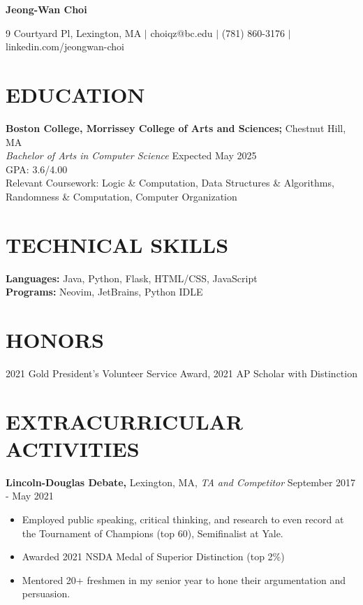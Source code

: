 \documentclass[11pt]{article}
\begin{document}
\begin{center}
\textbf{\LARGE Jeong-Wan Choi}
\end{center}

\begin{center}
9 Courtyard Pl, Lexington, MA $|$ choiqz@bc.edu $|$ (781) 860-3176 $|$ linkedin.com/jeongwan-choi
\end{center}

\section*{EDUCATION}
\textbf{Boston College, Morrissey College of Arts and Sciences;} Chestnut Hill, MA \\
\textit {Bachelor of Arts in Computer Science} \hfill {Expected May 2025} \\
GPA: 3.6/4.00 \\
Relevant Coursework: Logic \& Computation, Data Structures \& Algorithms, Randomness \& Computation, Computer Organization

\section*{TECHNICAL SKILLS}
\textbf{Languages:} Java, Python, Flask, HTML/CSS, JavaScript \\
\textbf{Programs:} Neovim, JetBrains, Python IDLE

\section*{HONORS}
2021 Gold President’s Volunteer Service Award, 2021 AP Scholar with Distinction

\section*{EXTRACURRICULAR ACTIVITIES}
\textbf{Lincoln-Douglas Debate,} Lexington, MA, \textit {TA and Competitor} \hfill September 2017 - May 2021 \\
\begin{itemize}
	\item Employed public speaking, critical thinking, and research to even record at the Tournament of Champions (top 60), Semifinalist at Yale. 
	\item Awarded 2021 NSDA Medal of Superior Distinction (top 2\%)
  \item Mentored 20+ freshmen in my senior year to hone their argumentation and persuasion.
\end{itemize}
\end{document}
